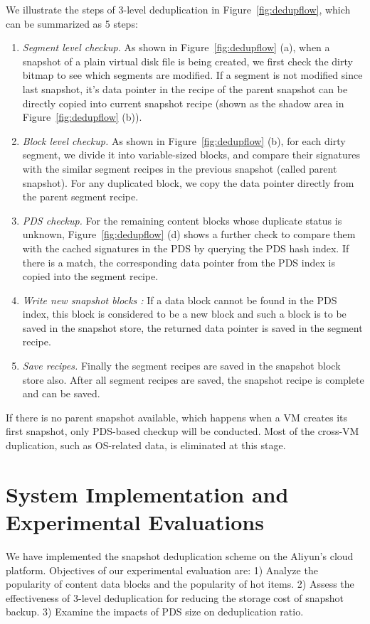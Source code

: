 We illustrate the steps of 3-level deduplication in Figure~\ref{fig:dedupflow}, which can be summarized as 5 steps:
\begin{enumerate}
\item {\em Segment level checkup.}
As shown in Figure~\ref{fig:dedupflow} (a),
when  a snapshot of a plain virtual disk file is being created, we first check the dirty bitmap 
to see which segments are modified. If a segment is not modified since last snapshot, 
it's data pointer in the recipe of the  parent snapshot  can be directly copied into 
current snapshot recipe (shown as the shadow area in Figure~\ref{fig:dedupflow} (b)).

\item {\em Block level checkup.}
As shown in Figure~\ref{fig:dedupflow} (b),
for each dirty segment, we divide it into variable-sized blocks,
and compare their signatures with  the similar segment recipes in the previous snapshot (called parent
snapshot). 
For any duplicated block, we copy the data pointer directly from the parent segment recipe. 
\item {\em PDS checkup.} For the remaining  content blocks whose duplicate status is unknown,
Figure~\ref{fig:dedupflow} (d)
shows  a further check to compare  them with  the cached signatures in the PDS by querying
the PDS hash index. If there is a match, the corresponding data pointer from the PDS index is
copied into the segment recipe. 
\item {\em Write new snapshot blocks :}
If a data block cannot be found in the PDS index, this block is considered to be a new block
and such a block is to be saved in the snapshot store, the returned data pointer is
saved in the  segment recipe.
\item {\em Save recipes.} Finally the  segment recipes are saved in the  snapshot block store also.
 After all segment recipes are saved, the snapshot recipe is complete and can be saved.
\end{enumerate}

If there is no parent snapshot available, which happens when a VM creates its first snapshot, 
only PDS-based checkup will be conducted. 
Most of the cross-VM duplication, such as OS-related data, is eliminated
at this stage. 


\section{System Implementation and Experimental Evaluations}
\label{inline:impl}
We have implemented the snapshot deduplication scheme on the Aliyun's cloud platform.
Objectives of our experimental evaluation are:
1) Analyze the popularity of content data blocks and the popularity  of hot items.
2) Assess the effectiveness  of 3-level deduplication for reducing the storage cost of snapshot
backup.
3) Examine the impacts of PDS size on deduplication ratio.

